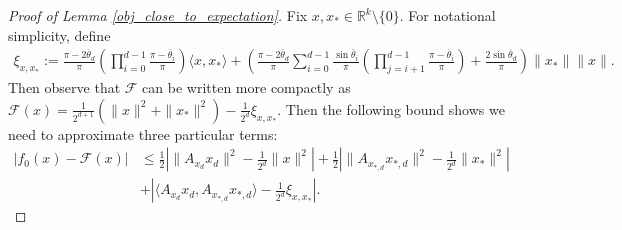 \documentclass[11pt]{article}
\newcommand{\R}{\mathbb{R}}
\newcommand{\F}{\mathcal{F}}
\theoremstyle{remark}
\begin{document}
\begin{proof}[Proof of Lemma \ref{obj_close_to_expectation}] Fix $x,x_* \in \R^{k} \setminus \{0\}$. For notational simplicity, define \begin{align*}
    \xi_{x,x_*} := \frac{\pi - 2\overline{\theta}_d}{\pi}\left(\prod_{i=0}^{d-1} \frac{\pi - \overline{\theta}_i}{\pi}\right)\langle x,x_*\rangle  + \left(\frac{\pi - 2\overline{\theta}_d}{\pi}\sum_{i=0}^{d-1}\frac{\sin\overline{\theta}_i}{\pi} \left(\prod_{j=i+1}^{d-1} \frac{\pi - \overline{\theta}_i}{\pi}\right) + \frac{2\sin\overline{\theta}_d}{\pi} \right)\|x_*\|\|x\|.
\end{align*} Then observe that $\mathcal{F}$ can be written more compactly as 
    $\F(x) = \frac{1}{2^{d+1}}(\|x\|^2 + \|x_*\|^2) - \frac{1}{2^d} \xi_{x,x_*}.$
Then the following bound shows we need to approximate three particular terms: \begin{align*}
|f_0(x) - \mathcal{F}(x)| & \leqslant \frac{1}{2}\left|\|A_{x_d}x_d\|^2 - \frac{1}{2^d}\|x\|^2\right| + \frac{1}{2}\left|\|A_{x_{*,d}}x_{*,d}\|^2 - \frac{1}{2^d}\|x_*\|^2\right|  \\
& + \left| \langle A_{x_d}x_d, A_{x_{*,d}}x_{*,d}\rangle - \frac{1}{2^d}\xi_{x,x_*}\right|.
\end{align*} 


\end{proof}
\end{document}
